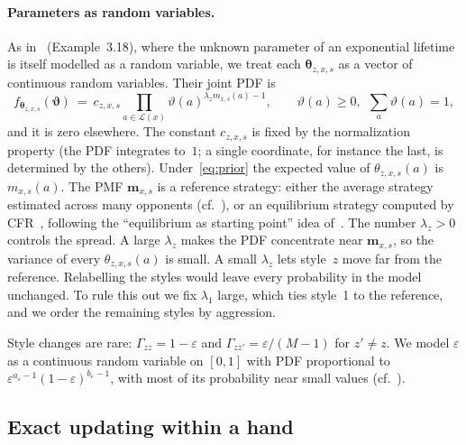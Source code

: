 \documentclass[11pt,a4paper]{article}
\newcommand{\1}{\mathbf{1}}
\newcommand{\BT}[1]{\cite[§#1]{bertsekas2000}}
\begin{document}
\paragraph{Parameters as random variables.} As in~\BT{3.5} (Example~3.18), where
the unknown parameter of an exponential lifetime is itself modelled as a
random variable, we treat each $\bm\theta_{z,x,s}$ as a vector of continuous
random variables. Their joint PDF is
\begin{equation}
  f_{\bm\theta_{z,x,s}}(\bm\vartheta)\ =\ c_{z,x,s}\prod_{a\in\mathcal{L}(x)}\vartheta(a)^{\lambda_z m_{x,s}(a)-1},
  \qquad \vartheta(a)\ge0,\ \ \textstyle\sum_a\vartheta(a)=1,
  \label{eq:prior}
\end{equation}
and it is zero elsewhere. The constant $c_{z,x,s}$ is fixed by the
normalization property (the PDF integrates to~$1$; a single coordinate, for
instance the last, is determined by the others). Under~\eqref{eq:prior} the
expected value of $\theta_{z,x,s}(a)$ is $m_{x,s}(a)$. The PMF
$\mathbf{m}_{x,s}$ is a reference strategy: either the average strategy
estimated across many opponents (cf.~\cite{ponsen2008}), or an equilibrium
strategy computed by CFR~\cite{zinkevich2007}, following the
``equilibrium as starting point'' idea of~\cite{ganzfried2011}. The number
$\lambda_z>0$ controls the spread. A large $\lambda_z$ makes the PDF
concentrate near $\mathbf{m}_{x,s}$, so the variance of every
$\theta_{z,x,s}(a)$ is small. A small $\lambda_z$ lets style~$z$ move far from
the reference. Relabelling the styles would leave every probability in the
model unchanged. To rule this out we fix $\lambda_1$ large, which ties style~1
to the reference, and we order the remaining styles by aggression.

Style changes are rare: $\Gamma_{zz}=1-\varepsilon$ and
$\Gamma_{zz'}=\varepsilon/(M-1)$ for $z'\neq z$. We model $\varepsilon$ as a
continuous random variable on $[0,1]$ with PDF proportional to
$\varepsilon^{a_\varepsilon-1}(1-\varepsilon)^{b_\varepsilon-1}$, with most of its
probability near small values (cf.~\cite{fox2008}).

\subsection{Exact updating within a hand}
\end{document}
